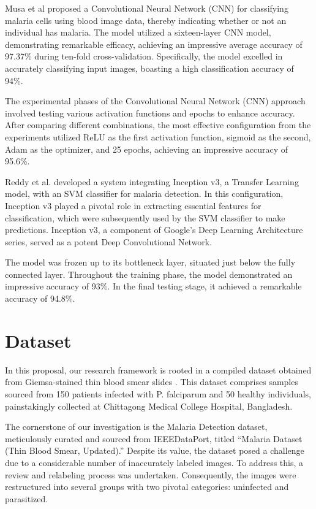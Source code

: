 \documentclass[journal,11pt,onecolumn,draftcls]{IEEEtran}
\begin{document}
Musa et al \cite{musa2022} proposed a Convolutional Neural Network (CNN) for classifying malaria cells using blood image data, thereby indicating whether or not an individual has malaria. The model utilized a sixteen-layer CNN model, demonstrating remarkable efficacy, achieving an impressive average accuracy of 97.37\% during ten-fold cross-validation. Specifically, the model excelled in accurately classifying input images, boasting a high classification accuracy of 94\%.

The experimental phases of the Convolutional Neural Network (CNN) approach involved testing various activation functions and epochs to enhance accuracy. After comparing different combinations, the most effective configuration from the experiments utilized ReLU as the first activation function, sigmoid as the second, Adam as the optimizer, and 25 epochs, achieving an impressive accuracy of 95.6\%.

Reddy et al. \cite{reddy2021} developed a system integrating Inception v3, a Transfer Learning model, with an SVM classifier for malaria detection. In this configuration, Inception v3 played a pivotal role in extracting essential features for classification, which were subsequently used by the SVM classifier to make predictions. Inception v3, a component of Google's Deep Learning Architecture series, served as a potent Deep Convolutional Network.

The model was frozen up to its bottleneck layer, situated just below the fully connected layer. Throughout the training phase, the model demonstrated an impressive accuracy of 93\%. In the final testing stage, it achieved a remarkable accuracy of 94.8\%.

\section{Dataset}
In this proposal, our research framework is rooted in a compiled dataset obtained from Giemsa-stained thin blood smear slides \cite{chakradeo2020}. This dataset comprises samples sourced from 150 patients infected with P. falciparum and 50 healthy individuals, painstakingly collected at Chittagong Medical College Hospital, Bangladesh.

The cornerstone of our investigation is the Malaria Detection dataset, meticulously curated and sourced from IEEEDataPort, titled ``Malaria Dataset (Thin Blood Smear, Updated).'' Despite its value, the dataset posed a challenge due to a considerable number of inaccurately labeled images. To address this, a review and relabeling process was undertaken. Consequently, the images were restructured into several groups with two pivotal categories: uninfected and parasitized.
\end{document}
